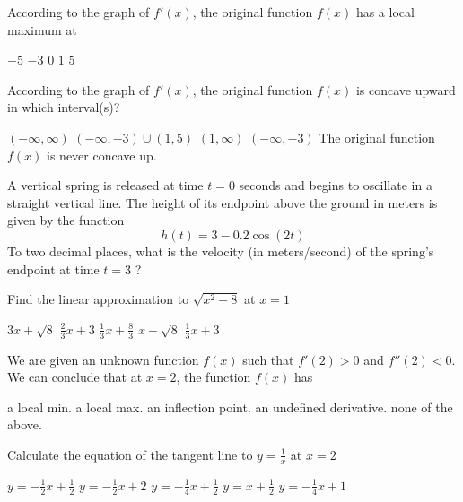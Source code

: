 \documentclass[11pt]{article}
\begin{document}
\begin{questions}
\begin{multiplechoice}{5}
\question According to the graph of $f'(x)$, the original function $f(x)$ has a local maximum at
\begin{answers}{3}
\ans $-5$
\ans $-3$
\ans $0$
\ans $1$
\ans $5$
\end{answers}


\question According to the graph of $f'(x)$, the original function $f(x)$ is concave upward in which interval(s)?
\begin{answers}{2}
\ans $(-\infty, \infty)$
\ans $(-\infty, -3) \cup (1,5)$
\ans $(1, \infty)$
\ans $(-\infty, -3)$
\ans The original function $f(x)$ is never concave up.
\end{answers}



\question A vertical spring is released at time $t = 0$ seconds and begins to oscillate in a straight vertical line.
The height of its endpoint above the ground in meters is given by the function
$$h(t) = 3 - 0.2\cos(2t)$$
To two decimal places, what is the velocity (in meters/second) of the spring's endpoint at time $t = 3$ ?
\begin{answers}{3}
\end{answers}

\newpage

\question Find the linear approximation to $\sqrt{x^2+8}$ at $x = 1$
\begin{answers}{2}
\ans $3x + \sqrt{8}$
\ans $\frac{2}{3}x + 3$
\ans $\frac{1}{3} x + \frac{8}{3}$
\ans $x + \sqrt{8}$
\ans $\frac{1}{3} x + 3$
\end{answers}


\question We are given an unknown function $f(x)$ such that $f'(2) > 0$ and $f''(2) < 0$.
We can conclude that at $x = 2$, the function $f(x)$ has 
\begin{answers}{2}
\ans a local min.
\ans a local max.
\ans an inflection point.
\ans an undefined derivative.
\ans none of the above.
\end{answers}

\question Calculate the equation of the tangent line to $y = \frac{1}{x}$ at $x = 2$
\begin{answers}{2}
\ans $y = -\frac{1}{2}x + \frac{1}{2}$
\ans $y = -\frac{1}{2}x + 2$
\ans $y = -\frac{1}{4}x + \frac{1}{2}$
\ans $y = x + \frac{1}{2}$
\ans $y = -\frac{1}{4}x + 1$
\end{answers}








\end{multiplechoice}
\end{questions}
\end{document}
